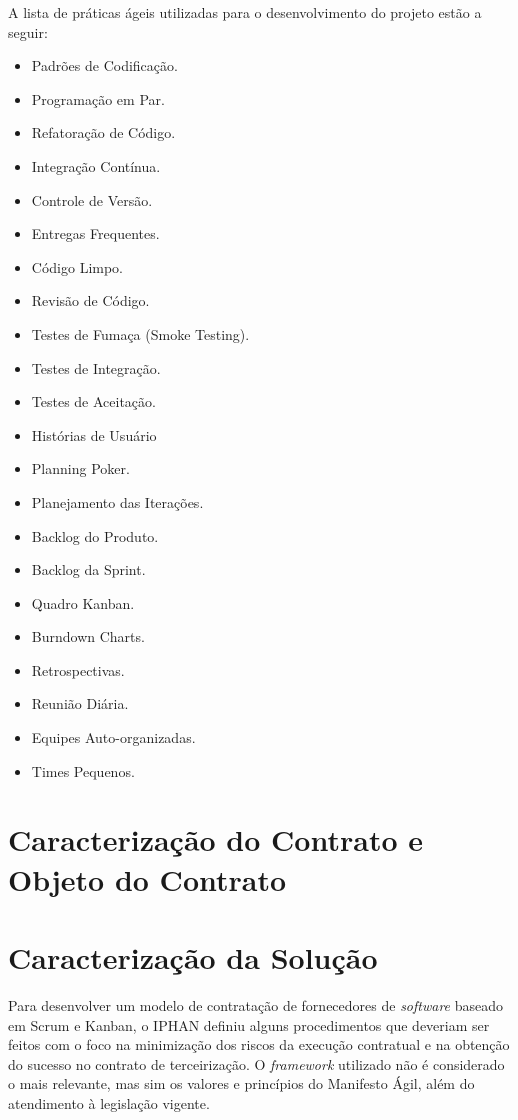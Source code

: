 A lista de práticas ágeis utilizadas para o desenvolvimento do projeto estão a seguir:
\begin{itemize}
\item Padrões de Codificação.
\item Programação em Par.
\item Refatoração de Código.
\item Integração Contínua.
\item Controle de Versão.
\item Entregas Frequentes.
\item Código Limpo.
\item Revisão de Código.
\item Testes de Fumaça (Smoke Testing).
\item Testes de Integração.
\item Testes de Aceitação.
\item Histórias de Usuário
\item Planning Poker.
\item Planejamento das Iterações.
\item Backlog do Produto.
\item Backlog da Sprint.
\item Quadro Kanban.
\item Burndown Charts.
\item Retrospectivas.
\item Reunião Diária.
\item Equipes Auto-organizadas.
\item Times Pequenos.
\end{itemize}


\section[Caracterização do Contrato e Objeto do Contrato]{Caracterização do Contrato e Objeto do Contrato}


\section[Caracterização da Solução]{Caracterização da Solução}

Para desenvolver um modelo de contratação de fornecedores de \textit{software} baseado em Scrum e Kanban, o IPHAN definiu alguns procedimentos que deveriam ser feitos com o foco na minimização dos riscos da execução contratual e na obtenção do sucesso no contrato de terceirização. O \textit{framework} utilizado não é considerado o mais relevante, mas sim os valores e princípios do Manifesto Ágil, além do atendimento à legislação vigente. 

